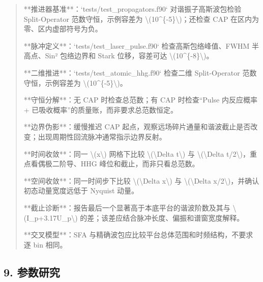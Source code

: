 \documentclass[UTF8,openany,11pt,fontset=fandol]{ctexbook}
\begin{document}
\begin{quote}
**推进器基准**：`tests/test\_propagators.f90` 对谐振子高斯波包检验
Split-Operator 范数守恒，示例容差为
\textbackslash(10\^{}\{-5\}\textbackslash)；还检查 CAP
在区内为零、区内虚部符号为负。

**脉冲定义**：`tests/test\_laser\_pulse.f90` 检查高斯包络峰值、FWHM
半高点、Sin² 包络边界和 Stark 位移，容差可达
\textbackslash(10\^{}\{-8\}\textbackslash)。

**二维推进**：`tests/test\_atomic\_hhg.f90` 检查二维 Split-Operator
范数守恒，示例容差为 \textbackslash(10\^{}\{-5\}\textbackslash)。

**守恒分解**：无 CAP 时检查总范数；有 CAP 时检查``Pulse 内反应概率 +
已吸收概率''的质量账，而非要求总范数恒定。

**边界伪影**：缓慢推迟 CAP
起点，观察远场碎片通量和谐波截止是否改变；出现周期性回流脉冲通常指示边界反射。

**时间收敛**：同一 \textbackslash(x\textbackslash) 网格下比较
\textbackslash(\textbackslash Delta t\textbackslash) 与
\textbackslash(\textbackslash Delta
t/2\textbackslash)，重点看偶极二阶导、HHG 峰位和截止，而非只看总范数。

**空间收敛**：同一时间步下比较 \textbackslash(\textbackslash Delta
x\textbackslash) 与 \textbackslash(\textbackslash Delta
x/2\textbackslash)，并确认初态动量宽度远低于 Nyquist 动量。

**截止诊断**：报告最后一个显著高于本底平台的谐波阶数及其与
\textbackslash(I\_p+3.17U\_p\textbackslash)
的差；该差应结合脉冲长度、偏振和谱窗宽度解释。

**交叉模型**：SFA 与精确波包应比较平台总体范围和时频结构，不要求逐 bin
相同。
\end{quote}

\subsection{\texorpdfstring{\textbf{9.
参数研究}}{9. 参数研究}}\label{ux53c2ux6570ux7814ux7a76-1}
\end{document}

